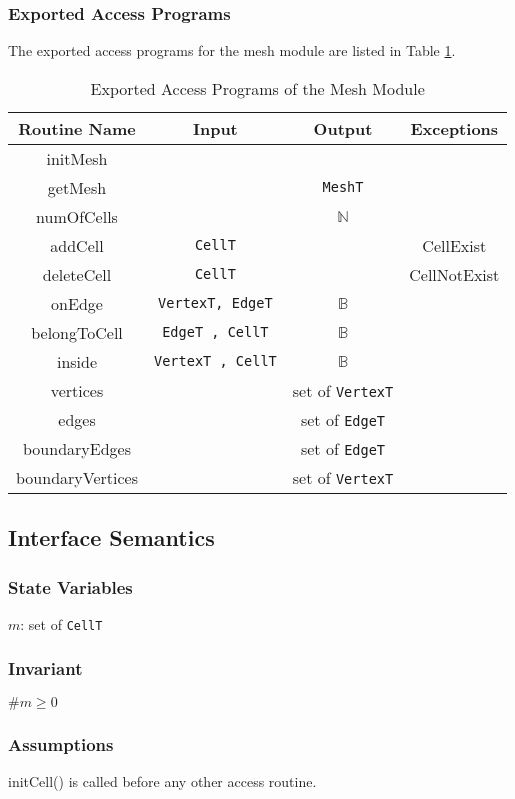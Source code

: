\documentclass[12pt,titlepage]{article}
\begin{document}
\subsubsection{Exported Access Programs}
The exported access programs for the mesh module are listed in Table \ref{AmisMEAP}.
\begin{table}[htbp]
\centering
\begin{tabular}{|c|c|c|c|}
\hline
Routine Name & Input & Output & Exceptions \\ 
\hline
initMesh & & & \\
\hline
getMesh &  & {\tt MeshT} & \\
\hline
numOfCells &  & $\mathbb{N}$ & \\
\hline
addCell & {\tt CellT} &  & CellExist\\
\hline
deleteCell & {\tt CellT} &  & CellNotExist\\
\hline
onEdge & {\tt VertexT, EdgeT}& $\mathbb{B}$ & \\
\hline
belongToCell &{\tt EdgeT , CellT}&$ \mathbb{B}$&\\
\hline
inside &{\tt VertexT , CellT}&$ \mathbb{B}$&\\
\hline
vertices & & set of {\tt VertexT}&\\
\hline
edges & & set of {\tt EdgeT}&\\
\hline
boundaryEdges & & set of {\tt EdgeT}&\\
\hline
boundaryVertices & &set of {\tt VertexT}&\\
\hline
\end{tabular}
\caption{Exported Access Programs of the Mesh Module}
\label{AmisMEAP} 
\end{table}

\subsection{Interface Semantics}
\subsubsection{State Variables}
$m$: set of {\tt CellT}
\subsubsection{Invariant}
$\# m\geq 0$
\subsubsection{Assumptions}initCell() is called before any other access routine.
\end{document}
